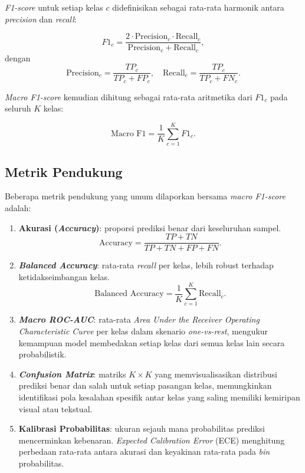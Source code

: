 \textit{F1-score} untuk setiap kelas $c$ didefinisikan sebagai rata-rata harmonik antara \textit{precision} dan \textit{recall}:

\begin{equation}
    F1_c = \frac{2 \cdot \text{Precision}_c \cdot \text{Recall}_c}{\text{Precision}_c + \text{Recall}_c},
    \label{eq:f1}
\end{equation}
dengan
\begin{equation}
    \text{Precision}_c = \frac{TP_c}{TP_c + FP_c}, \quad
    \text{Recall}_c = \frac{TP_c}{TP_c + FN_c}.
    \label{eq:precrec}
\end{equation}

\textit{Macro F1-score} kemudian dihitung sebagai rata-rata aritmetika dari $F1_c$ pada seluruh $K$ kelas:

\begin{equation}
    \text{Macro F1} = \frac{1}{K} \sum_{c=1}^{K} F1_c.
    \label{eq:macrof1}
\end{equation}

\subsection{Metrik Pendukung}

Beberapa metrik pendukung yang umum dilaporkan bersama \textit{macro F1-score} adalah:

\begin{enumerate}
    \item \textbf{Akurasi (\textit{Accuracy})}: proporsi prediksi benar dari keseluruhan sampel.
    \begin{equation}
        \text{Accuracy} = \frac{TP + TN}{TP + TN + FP + FN}.
        \label{eq:accuracy}
    \end{equation}
    \item \textbf{\textit{Balanced Accuracy}}: rata-rata \textit{recall} per kelas, lebih robust terhadap ketidakseimbangan kelas.
    \begin{equation}
        \text{Balanced Accuracy} = \frac{1}{K} \sum_{c=1}^{K} \text{Recall}_c.
        \label{eq:balancedacc}
    \end{equation}
    \item \textbf{\textit{Macro ROC-AUC}}: rata-rata \textit{Area Under the Receiver Operating Characteristic Curve} per kelas dalam skenario \textit{one-vs-rest}, mengukur kemampuan model membedakan setiap kelas dari semua kelas lain secara probabilistik.
    \item \textbf{\textit{Confusion Matrix}}: matriks $K \times K$ yang memvisualisasikan distribusi prediksi benar dan salah untuk setiap pasangan kelas, memungkinkan identifikasi pola kesalahan spesifik antar kelas yang saling memiliki kemiripan visual atau tekstual.
    \item \textbf{Kalibrasi Probabilitas}: ukuran sejauh mana probabilitas prediksi mencerminkan kebenaran. \textit{Expected Calibration Error} (ECE) menghitung perbedaan rata-rata antara akurasi dan keyakinan rata-rata pada \textit{bin} probabilitas.
\end{enumerate}

